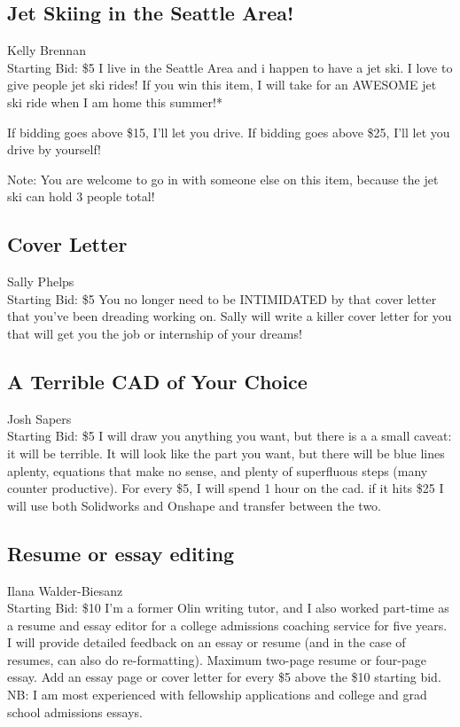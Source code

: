 \documentclass[11pt]{article}
\begin{document}
\subsection{Jet Skiing in the Seattle Area!}
Kelly Brennan
\\
Starting Bid: \$5
\newline
I live in the Seattle Area and i happen to have a jet ski. I love to give people jet ski rides! If you win this item, I will take for an AWESOME jet ski ride when I am home this summer!* 

If bidding goes above \$15, I'll let you drive. If bidding goes above \$25, I'll let you drive by yourself! 

Note: You are welcome to go in with someone else on this item, because the jet ski can hold 3 people total!
\subsection{Cover Letter}
Sally Phelps
\\
Starting Bid: \$5
\newline
You no longer need to be INTIMIDATED by that cover letter that you've been dreading working on.  Sally will write a killer cover letter for you that will get you the job or internship of your dreams!
\subsection{A Terrible CAD of Your Choice}
Josh Sapers
\\
Starting Bid: \$5
\newline
I will draw you anything you want, but there is a a small caveat: it will be terrible. It will look like the part you want, but there will be blue lines aplenty, equations that make no sense, and plenty of superfluous steps (many counter productive). For every \$5, I will spend 1 hour on the cad. if it hits \$25 I will use both Solidworks and Onshape and transfer between the two.
\subsection{Resume or essay editing}
Ilana Walder-Biesanz
\\
Starting Bid: \$10
\newline
I'm a former Olin writing tutor, and I also worked part-time as a resume and essay editor for a college admissions coaching service for five years. I will provide detailed feedback on an essay or resume (and in the case of resumes, can also do re-formatting). Maximum two-page resume or four-page essay. Add an essay page or cover letter for every \$5 above the \$10 starting bid. NB: I am most experienced with fellowship applications and college and grad school admissions essays.
\end{document}
